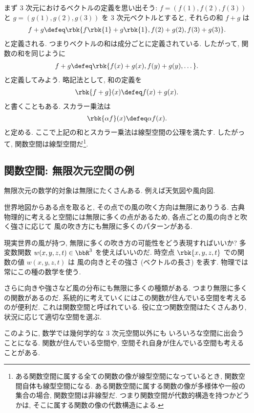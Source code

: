 \documentclass[openany, a4paper, oneside]{jsbook}
\begin{document}
まず 3 次元におけるベクトルの定義を思い出そう:
$f = (f(1), f(2), f(3))$ と $g = (g(1), g(2), g(3))$ を 3 次元ベクトルとすると,
それらの和 $f + g$ は
\begin{align}
 f + g
 \defeq
 \rbk{f\rbk{1} + g \rbk{1}, f(2) + g(2), f(3) + g(3)}.
\end{align}
と定義される.
つまりベクトルの和は成分ごとに定義されている.
したがって, 関数の和を同じように
\begin{align}
 f + g
 \defeq
 \rbk{f(x) + g(x), f(y) + g(y), \dots}.
\end{align}
と定義してみよう.
略記法として, 和の定義を
\begin{align}
 \rbk{f + g} (x)
 \defeq
 f(x) + g(x).
\end{align}
と書くこともある.
スカラー乗法は
\begin{align}
 \rbk{\alpha f} (x)
 \defeq
 \alpha f (x).
\end{align}
と定める.
ここで上記の和とスカラー乗法は線型空間の公理を満たす.
したがって, 関数空間は線型空間だ\footnote{ある関数空間に属する全ての関数の像が線型空間になっているとき, 関数空間自体も線型空間になる.
ある関数空間に属する関数の像が多様体や一般の集合の場合, 関数空間は非線型だ.
つまり関数空間が代数的構造を持つかどうかは, そこに属する関数の像の代数構造による.}.
\subsection{関数空間: 無限次元空間の例}

無限次元の数学的対象は無限にたくさんある.
例えば天気図や風向図.

世界地図からある点を取ると,
その点での風の吹く方向は無限にありうる.
古典物理的に考えると空間には無限に多くの点があるため,
各点ごとの風の向きと吹く強さに応じて
風の吹き方にも無限に多くのパターンがある.

現実世界の風が持つ, 無限に多くの吹き方の可能性をどう表現すればいいか?
多変数関数 $w(x,y,z,t) \in \bbR^3$ を使えばいいのだ.
時空点 $\rbk{x, y, z, t}$ での関数の値 $w(x,y,z,t)$ は
風の向きとその強さ (ベクトルの長さ) を表す.
物理では常にこの種の数学を使う.

さらに向きや強さなど風の分布にも無限に多くの種類がある.
つまり無限に多くの関数があるのだ.
系統的に考えていくにはこの関数が住んでいる空間を考えるのが便利だ.
これは関数空間と呼ばれている.
役に立つ関数空間はたくさんあり, 状況に応じて適切な空間を選ぶ.

このように, 数学では幾何学的な 3 次元空間以外にも
いろいろな空間に出会うことになる.
関数が住んでいる空間や, 空間それ自身が住んでいる空間も考えることがある.
\end{document}

